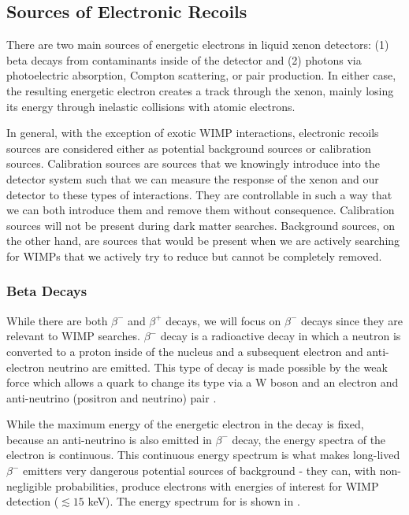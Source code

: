\subsection{Sources of Electronic Recoils}

There are two main sources of energetic electrons in liquid xenon detectors: (1) beta decays from contaminants inside of the detector and (2) photons via photoelectric absorption, Compton scattering, or pair production.  In either case, the resulting energetic electron creates a track through the xenon, mainly losing its energy through inelastic collisions with atomic electrons.  

In general, with the exception of exotic WIMP interactions, electronic recoils sources are considered either as potential background sources or calibration sources.  Calibration sources are sources that we knowingly introduce into the detector system such that we can measure the response of the xenon and our detector to these types of interactions.  They are controllable in such a way that we can both introduce them and remove them without consequence.  Calibration sources will not be present during dark matter searches.  Background sources, on the other hand, are sources that would be present when we are actively searching for WIMPs that we actively try to reduce but cannot be completely removed.

\subsubsection{Beta Decays}

While there are both $\beta^-$ and $\beta^+$ decays, we will focus on $\beta^-$ decays since they are relevant to WIMP searches.  $\beta^-$ decay is a radioactive decay in which a neutron is converted to a proton inside of the nucleus and a subsequent electron and anti-electron neutrino are emitted.  This type of decay is made possible by the weak force which allows a quark to change its type via a W boson and an electron and anti-neutrino (positron and neutrino) pair \cite{cottingham1987introduction}.

While the maximum energy of the energetic electron in the decay is fixed, because an anti-neutrino is also emitted in $\beta^-$ decay, the energy spectra of the electron is continuous.  This continuous energy spectrum is what makes long-lived $\beta^-$ emitters very dangerous potential sources of background - they can, with non-negligible probabilities, produce electrons with energies of interest for WIMP detection ($\lesssim 15$ keV).  The energy spectrum for \krypton{} is shown in .

